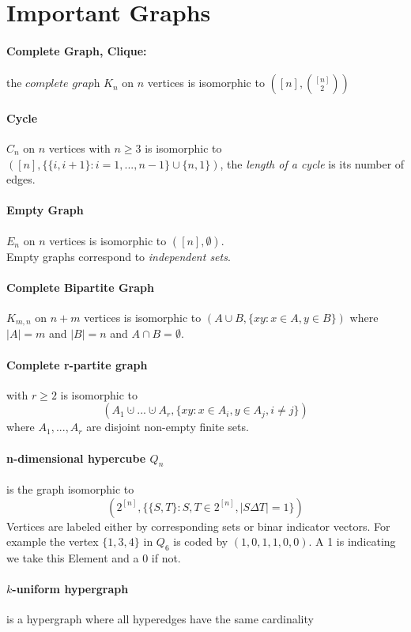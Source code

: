 \section{Important Graphs}

\paragraph{Complete Graph, Clique:} $ $ \\ 
the $ \textit{complete graph } K_n $ on $ n $ vertices is isomorphic to
$ ([n], \binom{[n]}{2}) $ 

\paragraph{Cycle} $ $ \\
$C_n $ on $ n $ vertices with $ n \geq 3 $ is isomorphic to 
$ ([n], \{\{i,i+1\}: i = 1,...,n-1\} \cup \{n,1\}) $, the \textit{length of a cycle} 
is its number of edges.

\paragraph{Empty Graph} $ $ \\
$ E_n $ on $ n $ vertices is isomorphic to $ ([n],\emptyset) $. \\
Empty graphs correspond to \textit{independent sets}.

\paragraph{Complete Bipartite Graph} $ $ \\
$ K_{m,n} $ on $ n+m $ vertices is isomorphic to 
$ (A \cup B, \{xy: x \in A, y \in B \}) $ where $ |A| = m $ and $ |B| = n $ and
$ A \cap B = \emptyset $.

\paragraph{Complete r-partite graph}
with $ r \geq 2 $ is isomorphic to
$$ (A_1 \cupdot...\cupdot A_r, \{xy: x \in A_i, y \in A_j, i \neq j\}) $$ 
where $ A_1,...,A_r $ are disjoint non-empty finite sets.

\paragraph{n-dimensional hypercube $ Q_n $}
is the graph isomorphic to 
$$ (2^{[n]}, \{\{S,T\}: S,T \in 2^{[n]}, |S\Delta T| = 1\}) $$
Vertices are labeled either by corresponding sets or binar indicator vectors.
For example the vertex $ \{1,3,4\} $ in $ Q_6 $ is coded by $ (1,0,1,1,0,0) $.
A 1 is indicating we take this Element and a 0 if not.

\paragraph{$k$-uniform hypergraph}
is a hypergraph where all hyperedges have the same cardinality
